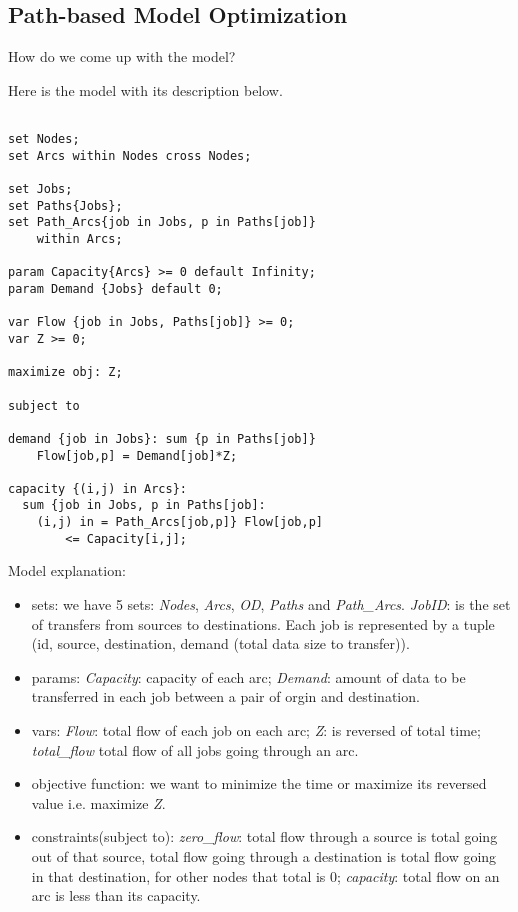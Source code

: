 \subsection{Path-based Model Optimization}

How do we come up with the model?

Here is the model with its description below.

\begingroup
\fontsize{9pt}{9pt}\selectfont

\begin{verbatim}

set Nodes;
set Arcs within Nodes cross Nodes;

set Jobs;
set Paths{Jobs};
set Path_Arcs{job in Jobs, p in Paths[job]} 
    within Arcs;

param Capacity{Arcs} >= 0 default Infinity;
param Demand {Jobs} default 0;

var Flow {job in Jobs, Paths[job]} >= 0;
var Z >= 0;

maximize obj: Z;

subject to

demand {job in Jobs}: sum {p in Paths[job]} 
	Flow[job,p] = Demand[job]*Z;

capacity {(i,j) in Arcs}:
  sum {job in Jobs, p in Paths[job]: 
    (i,j) in = Path_Arcs[job,p]} Flow[job,p] 
		<= Capacity[i,j];

\end{verbatim}

\endgroup

Model explanation:
\begin{itemize}
\item sets: we have 5 sets: \textit{Nodes}, \textit{Arcs}, \textit{OD}, \textit{Paths} and \textit{Path\_Arcs}. \textit{JobID}: is the set of transfers from sources to destinations. Each job is represented by a tuple (id, source, destination, demand (total data size to transfer)).
\item params: {\it Capacity}: capacity of each arc; {\it Demand}: amount of data to be transferred in each job between a pair of orgin and destination.
\item vars: \textit{Flow}: total flow of each job on each arc; \textit{Z}: is reversed of total time; \textit{total\_flow} total flow of all jobs going through an arc.
\item objective function: we want to minimize the time or maximize its reversed value i.e. maximize \textit{Z}.
\item constraints(subject to): \textit{zero\_flow}: total flow through a source is total going out of that source, total flow going through a destination is total flow going in that destination, for other nodes that total is 0; \textit{capacity}: total flow on an arc is less than its capacity.
\end{itemize}

